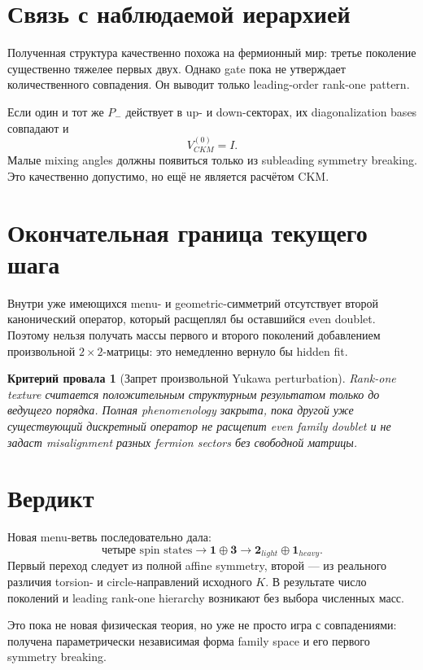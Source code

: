 \documentclass[12pt,a4paper]{article}
\newtheorem{nogocriterion}{Критерий провала}
\begin{document}
\section{Связь с наблюдаемой иерархией}

Полученная структура качественно похожа на фермионный мир: третье поколение существенно тяжелее первых двух. Однако gate пока не утверждает количественного совпадения. Он выводит только leading-order rank-one pattern.

Если один и тот же \(P_-\) действует в up- и down-секторах, их diagonalization bases совпадают и
\[
V_{CKM}^{(0)}=I.
\]
Малые mixing angles должны появиться только из subleading symmetry breaking. Это качественно допустимо, но ещё не является расчётом CKM.

\section{Окончательная граница текущего шага}

Внутри уже имеющихся menu- и geometric-симметрий отсутствует второй канонический оператор, который расщеплял бы оставшийся even doublet. Поэтому нельзя получать массы первого и второго поколений добавлением произвольной \(2\times2\)-матрицы: это немедленно вернуло бы hidden fit.

\begin{nogocriterion}[Запрет произвольной Yukawa perturbation]
Rank-one texture считается положительным структурным результатом только до ведущего порядка. Полная phenomenology закрыта, пока другой уже существующий дискретный оператор не расщепит even family doublet и не задаст misalignment разных fermion sectors без свободной матрицы.
\end{nogocriterion}

\section{Вердикт}

Новая menu-ветвь последовательно дала:
\[
\text{четыре spin states}
\longrightarrow
\mathbf1\oplus\mathbf3
\longrightarrow
\mathbf2_{light}\oplus\mathbf1_{heavy}.
\]
Первый переход следует из полной affine symmetry, второй --- из реального различия torsion- и circle-направлений исходного \(K\). В результате число поколений и leading rank-one hierarchy возникают без выбора численных масс.

Это пока не новая физическая теория, но уже не просто игра с совпадениями: получена параметрически независимая форма family space и его первого symmetry breaking.
\end{document}
